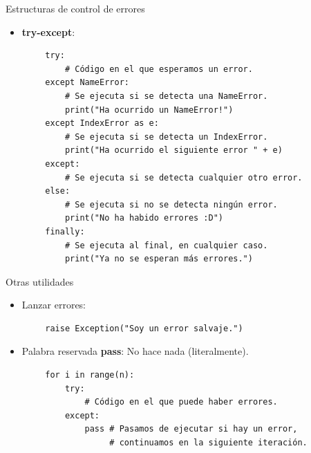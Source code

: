 \documentclass[10pt]{beamer} %
\begin{document}
\begin{frame}[fragile]{Estructuras de control de errores}
    \begin{itemize}
        \item \textbf{try-except}:
    \end{itemize}
    \begin{verbatim}
        try:
            # Código en el que esperamos un error.
        except NameError:
            # Se ejecuta si se detecta una NameError.
            print("Ha ocurrido un NameError!")
        except IndexError as e:
            # Se ejecuta si se detecta un IndexError.
            print("Ha ocurrido el siguiente error " + e)
        except:
            # Se ejecuta si se detecta cualquier otro error.
        else:
            # Se ejecuta si no se detecta ningún error.
            print("No ha habido errores :D")
        finally:
            # Se ejecuta al final, en cualquier caso.
            print("Ya no se esperan más errores.")
    \end{verbatim}
\end{frame}

\begin{frame}[fragile]{Otras utilidades}
    \begin{itemize}
        \item Lanzar errores:
    \end{itemize}
    \begin{verbatim}
        raise Exception("Soy un error salvaje.")
    \end{verbatim}
    \begin{itemize}
        \item Palabra reservada \textbf{pass}: No hace nada (literalmente).
    \end{itemize}
    \begin{verbatim}
        for i in range(n):
            try:
                # Código en el que puede haber errores.
            except:
                pass # Pasamos de ejecutar si hay un error,
                     # continuamos en la siguiente iteración.
    \end{verbatim}
\end{frame}
\end{document}

